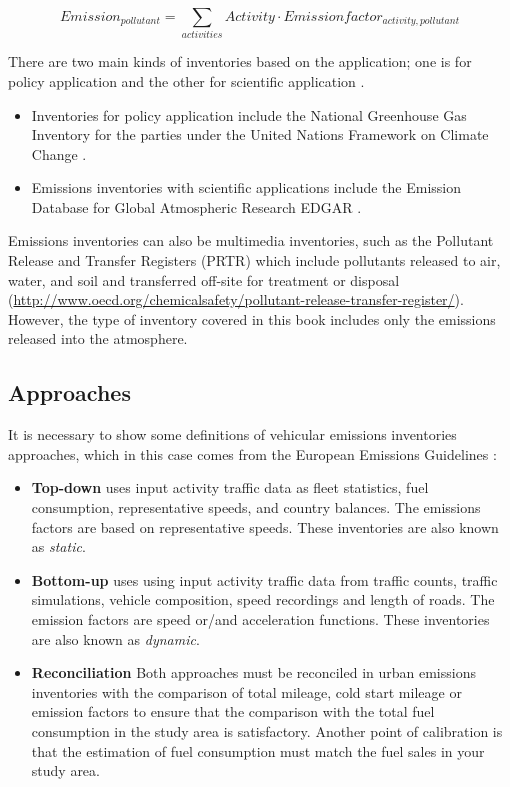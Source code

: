 \documentclass[12pt,graybox,envcountchap,sectrefs]{krantz}
\providecommand{\tightlist}{%
  \setlength{\itemsep}{0pt}\setlength{\parskip}{0pt}}
\theoremstyle{definition}
\theoremstyle{definition}
\theoremstyle{definition}
\theoremstyle{remark}
\begin{document}
\begin{equation}
Emission_{pollutant}=\sum_{activities} Activity \cdot Emission factor_{activity, pollutant}
\label{eq:efGERAL}
\end{equation}

There are two main kinds of inventories based on the application; one is
for policy application and the other for scientific application
\citep{pulles2010art}.

\begin{itemize}
\tightlist
\item
  Inventories for policy application include the National Greenhouse Gas
  Inventory for the parties under the United Nations Framework on
  Climate Change \citep{unfccc}.
\item
  Emissions inventories with scientific applications include the
  Emission Database for Global Atmospheric Research EDGAR \citep{edgar}.
\end{itemize}

Emissions inventories can also be multimedia inventories, such as the
Pollutant Release and Transfer Registers (PRTR) which include pollutants
released to air, water, and soil and transferred off-site for treatment
or disposal
(\url{http://www.oecd.org/chemicalsafety/pollutant-release-transfer-register/}).
However, the type of inventory covered in this book includes only the
emissions released into the atmosphere.

\subsection{Approaches}\label{approaches}

It is necessary to show some definitions of vehicular emissions
inventories approaches, which in this case comes from the European
Emissions Guidelines \citep{NtziachristosSamaras2016}:

\begin{itemize}
\tightlist
\item
  \textbf{Top-down} uses input activity traffic data as fleet
  statistics, fuel consumption, representative speeds, and country
  balances. The emissions factors are based on representative speeds.
  These inventories are also known as \emph{static}.
\item
  \textbf{Bottom-up} uses using input activity traffic data from traffic
  counts, traffic simulations, vehicle composition, speed recordings and
  length of roads. The emission factors are speed or/and acceleration
  functions. These inventories are also known as \emph{dynamic}.
\item
  \textbf{Reconciliation} Both approaches must be reconciled in urban
  emissions inventories with the comparison of total mileage, cold start
  mileage or emission factors to ensure that the comparison with the
  total fuel consumption in the study area is satisfactory. Another
  point of calibration is that the estimation of fuel consumption must
  match the fuel sales in your study area.
\end{itemize}
\end{document}
